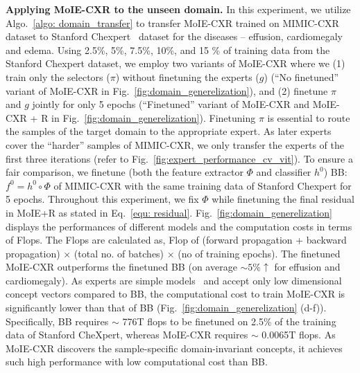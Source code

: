 \noindent \textbf{Applying MoIE-CXR to the unseen domain.} In this experiment, we utilize Algo.~\ref{algo: domain_transfer} to transfer MoIE-CXR trained on MIMIC-CXR dataset to Stanford Chexpert~\cite{irvin2019chexpert} dataset for the diseases -- effusion, cardiomegaly and edema. Using 2.5\%, 5\%, 7.5\%, 10\%, and 15 \% of training data from the Stanford Chexpert dataset, we employ two variants of MoIE-CXR where we (1) train only the selectors ($\pi$) without finetuning the experts ($g$) (``No finetuned'' variant of MoIE-CXR in Fig.~\ref{fig:domain_generelization}), and (2) finetune $\pi$ and $g$ jointly for only 5 epochs (``Finetuned'' variant of MoIE-CXR and MoIE-CXR + R in Fig.~\ref{fig:domain_generelization}). Finetuning $\pi$ is essential to route the samples of the target domain to the appropriate expert. As later experts cover the ``harder'' samples of MIMIC-CXR, we only transfer the experts of the first three iterations (refer to Fig.~\ref{fig:expert_performance_cv_vit}). To ensure a fair comparison, we finetune (both the feature extractor $\Phi$ and classifier $h^0$) BB: $f^0 = h^0 \circ \Phi$ of MIMIC-CXR with the same training data of Stanford Chexpert for 5 epochs. Throughout this experiment, we fix $\Phi$ while finetuning the final residual in MoIE+R as stated in Eq.~\ref{equ: residual}. Fig.~\ref{fig:domain_generelization} displays the performances of different models and the computation costs in terms of Flops. The Flops are calculated as, Flop of (forward propagation + backward propagation) $\times$ (total no. of batches) $\times$ (no of training epochs). The finetuned MoIE-CXR outperforms the finetuned BB (on average $\sim 5\% \uparrow$ for effusion and cardiomegaly).
As experts are simple models~\cite{barbiero2022entropy} and accept only low dimensional concept vectors compared to BB, the computational cost to train MoIE-CXR is significantly lower than that of BB (Fig.~\ref{fig:domain_generelization} (d-f)). Specifically, BB requires $\sim$ 776T flops to be finetuned on 2.5\% of the training data of Stanford CheXpert, whereas MoIE-CXR requires $\sim$ 0.0065T flops. As MoIE-CXR discovers the sample-specific domain-invariant concepts, it achieves such high performance with low computational cost than BB. 
